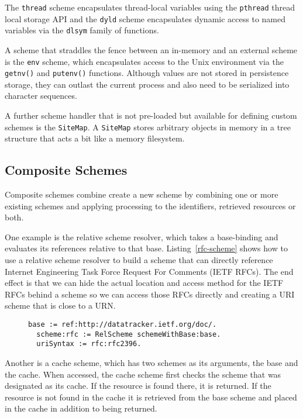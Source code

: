 \documentclass[preprint,authoryear]{acm_proc_article-sp}
\begin{document}
The {\tt thread} scheme encapsulates thread-local variables using the {\tt pthread} thread
local storage API and the {\tt dyld} scheme encapsulates dynamic access to
named variables via the {\tt dlsym} family of functions.

A scheme that straddles the fence between an in-memory and an external 
scheme is the {\tt env} scheme, which encapsulates access to the Unix
environment via the {\tt getnv()} and {\tt putenv()} functions.  Although 
values are not stored in persistence storage, they can outlast the
current process and also need to be serialized into character sequences.

A further scheme handler that is not pre-loaded but available for defining
custom schemes is the {\tt SiteMap}.  A {\tt SiteMap} stores arbitrary objects
in memory in a tree structure that acts a bit like a memory filesystem.

\subsection{Composite Schemes}

Composite schemes combine create a new scheme by combining one or 
more existing schemes and applying processing to the identifiers, retrieved
resources or both.


One example is the relative scheme resolver, which takes a base-binding
and evaluates its references relative to that base.  Listing~\ref{rfc-scheme} shows
how to use a relative scheme resolver to build a scheme that can directly
reference Internet Engineering Task Force Request For Comments (IETF RFCs).
The end effect is that we can hide the actual location and access method for
the IETF RFCs behind a scheme so we can access those RFCs directly and
creating a URI scheme that is close to a URN.


\begin{figure}[htbp]
\begin{lstlisting}[style=L,label=rfc-scheme,caption=Retrieving RFC 2396 (URI Syntax) via custom rfc: scheme.]
  base := ref:http://datatracker.ietf.org/doc/.
  scheme:rfc := RelScheme schemeWithBase:base.
  uriSyntax := rfc:rfc2396.
\end{lstlisting}
\end{figure}

Another is a cache scheme, which has two schemes as its arguments,
the base and the cache.  When accessed, the cache scheme first
checks the scheme that was designated as its cache.  If the resource
is found there, it is returned.   If the resource is not found in the cache
it is retrieved from the base scheme and placed in the cache in addition
to being returned.
\end{document}
